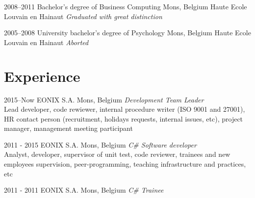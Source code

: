 \documentclass[a4paper]{cv-friggeri-x}
\begin{document}
\begin{entrylist}


\educationentry
{2008--2011}
{Bachelor’s degree {\normalfont of Business Computing}}
{Mons, Belgium}
{Haute Ecole Louvain en Hainaut}
{\emph{Graduated with great distinction}}


\educationentry
{2005--2008}
{University bachelor's degree {\normalfont of Psychology}}
{Mons, Belgium}
{Haute Ecole Louvain en Hainaut}
{\emph{Aborted}}


\end{entrylist}


\section{Experience}


\begin{entrylist}
\entry
{2015--Now}
{EONIX S.A.}
{Mons, Belgium}
{\emph{Development Team Leader}\\
Lead developer, code rewiewer, internal procedure writer (ISO 9001 and 27001), HR contact person (recruitment, holidays requests, internal issues, etc), project manager, management meeting participant}
\end{entrylist}

\begin{entrylist}
\entry
{2011 - 2015}
{EONIX S.A.}
{Mons, Belgium}
{\emph{C\# Software developer}\\
Analyst, developer, supervisor of unit test, code reviewer, trainees and new employees supervision, peer-programming, teaching infrastructure and practices, etc}
\end{entrylist}

\begin{entrylist}
\entry
{2011 - 2011}
{EONIX S.A.}
{Mons, Belgium}
{\emph{C\# Trainee}}
\end{entrylist}

\end{document}
